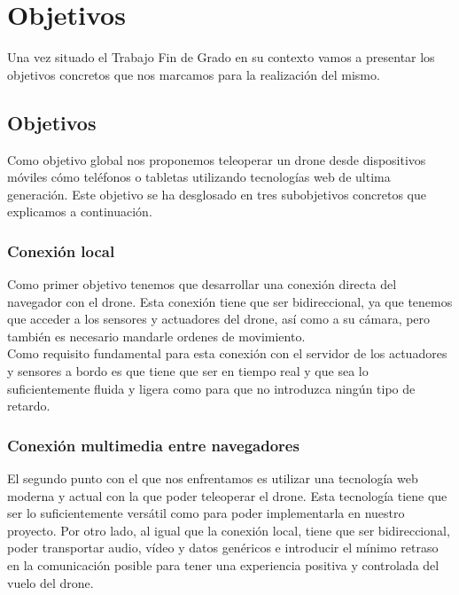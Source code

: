 \chapter{Objetivos}

Una vez situado el Trabajo Fin de Grado en su contexto vamos a presentar los objetivos concretos que nos marcamos para la realización del mismo.

\section{Objetivos}

Como objetivo global nos proponemos teleoperar un drone desde dispositivos móviles cómo teléfonos o tabletas utilizando tecnologías web de ultima generación. Este objetivo se ha desglosado en tres subobjetivos concretos que explicamos a continuación.\\

\subsection{Conexión local}

Como primer objetivo tenemos que desarrollar una conexión directa del navegador con el drone. Esta conexión tiene que ser bidireccional, ya que tenemos que acceder a los sensores y actuadores del drone, así como a su cámara, pero también es necesario mandarle ordenes de movimiento.\\

Como requisito fundamental para esta conexión con el servidor de los actuadores y sensores a bordo es que tiene que ser en tiempo real y que sea lo suficientemente fluida y ligera como para que no introduzca ningún tipo de retardo.\\


\subsection{Conexión multimedia entre navegadores}

El segundo punto con el que nos enfrentamos es utilizar una tecnología web moderna y actual con la que poder teleoperar el drone. Esta tecnología tiene que ser lo suficientemente versátil como para poder implementarla en nuestro proyecto. Por otro lado, al igual que la conexión local, tiene que ser bidireccional, poder transportar audio, vídeo y datos genéricos e introducir el mínimo retraso en la comunicación posible para tener una experiencia positiva y controlada del vuelo del drone.\\

